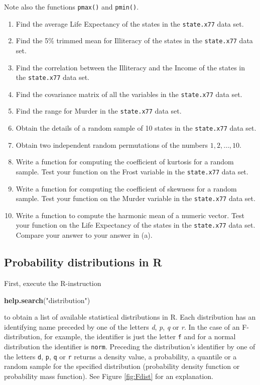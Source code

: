 \documentclass[
]{book}
\newenvironment{Shaded}{\begin{snugshade}}{\end{snugshade}}
\newcommand{\FunctionTok}[1]{\textcolor[rgb]{0.13,0.29,0.53}{\textbf{#1}}}
\newcommand{\NormalTok}[1]{#1}
\newcommand{\StringTok}[1]{\textcolor[rgb]{0.31,0.60,0.02}{#1}}
\providecommand{\tightlist}{%
  \setlength{\itemsep}{0pt}\setlength{\parskip}{0pt}}
\begin{document}
Note also the functions \texttt{pmax()} and \texttt{pmin()}.

\begin{enumerate}
\def\labelenumi{(\alph{enumi})}
\tightlist
\item
  Find the average Life Expectancy of the states in the \texttt{state.x77} data set.
\item
  Find the 5\% trimmed mean for Illiteracy of the states in the \texttt{state.x77} data set.
\item
  Find the correlation between the Illiteracy and the Income of the states in the \texttt{state.x77} data set.
\item
  Find the covariance matrix of all the variables in the \texttt{state.x77} data set.
\item
  Find the range for Murder in the \texttt{state.x77} data set.
\item
  Obtain the details of a random sample of 10 states in the \texttt{state.x77} data set.
\item
  Obtain two independent random permutations of the numbers \(1, 2, \dots, 10\).
\item
  Write a function for computing the coefficient of kurtosis for a random sample. Test your function on the Frost variable in the \texttt{state.x77} data set.
\item
  Write a function for computing the coefficient of skewness for a random sample. Test your function on the Murder variable in the \texttt{state.x77} data set.
\item
  Write a function to compute the harmonic mean of a numeric vector. Test your function on the Life Expectancy of the states in the \texttt{state.x77} data set. Compare your answer to your answer in (a).
\end{enumerate}

\subsection{Probability distributions in R}\label{probability-distributions-in-r}

First, execute the R-instruction

\begin{Shaded}
\begin{Highlighting}[]
\FunctionTok{help.search}\NormalTok{(}\StringTok{"distribution"}\NormalTok{)}
\end{Highlighting}
\end{Shaded}

to obtain a list of available statistical distributions in R. Each distribution has an identifying name preceded by one of the letters \emph{{d}}, \emph{{p}}, \emph{{q}} or \emph{{r}}. In the case of an F-distribution, for example, the identifier is just the letter \texttt{f} and for a normal distribution the identifier is \texttt{norm}. Preceding the distribution's identifier by one of the letters \texttt{d}, \texttt{p}, \texttt{q} or \texttt{r} returns a density value, a probability, a quantile or a random sample for the specified distribution (probability density function or probability mass function). See Figure \ref{fig:Fdist} for an explanation.
\end{document}
